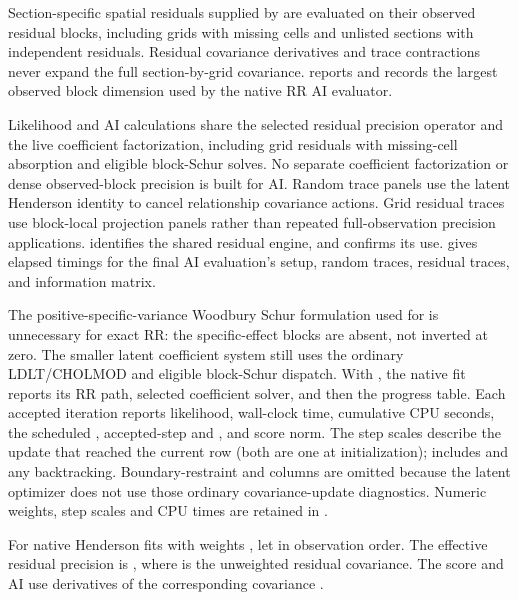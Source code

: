 \documentclass[a4paper]{book}
\begin{document}
\begin{Details}
Section-specific spatial residuals supplied by  are evaluated
on their observed residual blocks, including grids with missing cells and
unlisted sections with independent residuals. Residual covariance derivatives
and trace contractions never expand the full section-by-grid covariance.
 reports 
and  records the largest observed
block dimension used by the native RR AI evaluator.

Likelihood and AI calculations share the selected residual precision operator
and the live coefficient factorization, including grid residuals with
missing-cell absorption and eligible block-Schur solves. No separate
coefficient factorization or dense observed-block precision is built for AI.
Random trace panels use the latent Henderson identity to cancel relationship
covariance actions. Grid residual traces use block-local projection panels
rather than repeated full-observation precision applications.
 identifies the
shared residual engine, and  confirms its
use.  gives elapsed timings for the final AI
evaluation's setup, random traces, residual traces, and information matrix.

The positive-specific-variance Woodbury Schur formulation used for
 is unnecessary for exact RR: the specific-effect blocks are
absent, not inverted at zero. The smaller latent coefficient system still
uses the ordinary LDLT/CHOLMOD and eligible block-Schur dispatch.
With , the native fit reports its RR path, selected
coefficient solver, and then the progress table. Each accepted iteration
reports likelihood, wall-clock time, cumulative CPU seconds, the scheduled
, accepted-step  and ,
and score norm. The step scales describe the update that reached the current
row (both are one at initialization);  includes
 and any backtracking. Boundary-restraint and 
columns are omitted because the latent optimizer does not use those
ordinary covariance-update diagnostics. Numeric weights, step scales and
CPU times are retained in .

For native Henderson fits with weights , let
 in observation order. The effective residual
precision is , where  is the
unweighted residual covariance. The score and AI use derivatives of the
corresponding covariance .


\end{Details}
\end{document}
